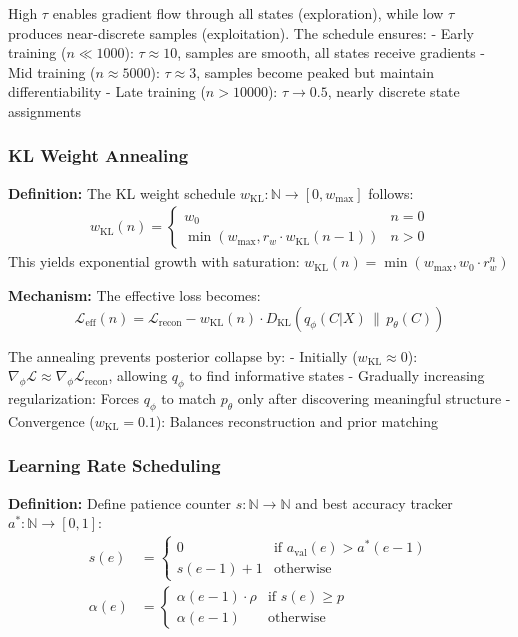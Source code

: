\documentclass[11pt]{article}
\newcommand{\kl}[2]{D_{\text{KL}}\left(#1 \,\|\, #2\right)}
\begin{document}
High $\tau$ enables gradient flow through all states (exploration), while low $\tau$ produces near-discrete samples (exploitation). The schedule ensures:
- Early training ($n \ll 1000$): $\tau \approx 10$, samples are smooth, all states receive gradients
- Mid training ($n \approx 5000$): $\tau \approx 3$, samples become peaked but maintain differentiability  
- Late training ($n > 10000$): $\tau \to 0.5$, nearly discrete state assignments

\subsubsection{KL Weight Annealing}

\textbf{Definition:}
The KL weight schedule $w_{\text{KL}}: \mathbb{N} \to [0, w_{\max}]$ follows:
\begin{align}
w_{\text{KL}}(n) = \begin{cases}
w_0 & n = 0 \\
\min(w_{\max}, r_w \cdot w_{\text{KL}}(n-1)) & n > 0
\end{cases}
\end{align}
This yields exponential growth with saturation: $w_{\text{KL}}(n) = \min(w_{\max}, w_0 \cdot r_w^n)$

\textbf{Mechanism:}
The effective loss becomes:
\begin{equation}
\mathcal{L}_{\text{eff}}(n) = \mathcal{L}_{\text{recon}} - w_{\text{KL}}(n) \cdot \kl{q_\phi(C|X)}{p_\theta(C)}
\end{equation}

The annealing prevents posterior collapse by:
- Initially ($w_{\text{KL}} \approx 0$): $\nabla_\phi \mathcal{L} \approx \nabla_\phi \mathcal{L}_{\text{recon}}$, allowing $q_\phi$ to find informative states
- Gradually increasing regularization: Forces $q_\phi$ to match $p_\theta$ only after discovering meaningful structure
- Convergence ($w_{\text{KL}} = 0.1$): Balances reconstruction and prior matching

\subsubsection{Learning Rate Scheduling}

\textbf{Definition:}
Define patience counter $s: \mathbb{N} \to \mathbb{N}$ and best accuracy tracker $a^*: \mathbb{N} \to [0,1]$:
\begin{align}
s(e) &= \begin{cases}
0 & \text{if } a_{\text{val}}(e) > a^*(e-1) \\
s(e-1) + 1 & \text{otherwise}
\end{cases} \\
\alpha(e) &= \begin{cases}
\alpha(e-1) \cdot \rho & \text{if } s(e) \geq p \\
\alpha(e-1) & \text{otherwise}
\end{cases}
\end{align}
\end{document}
